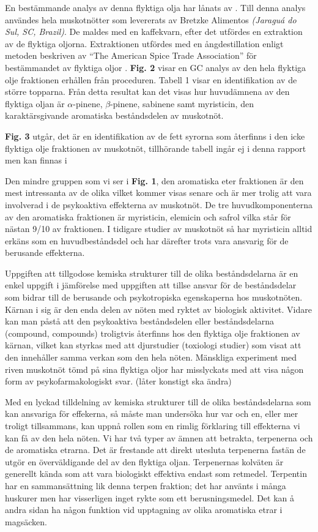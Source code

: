 \documentclass[a4paper,margin=3.25cm]{article}
\begin{document}
En bestämmande analys av denna flyktiga olja har lånats av \cite{spricigo1999extraction}.
Till denna analys användes hela muskotnötter som levererats av Bretzke Alimentos \textit{(Jaraguá do Sul, SC, Brazil)}. De maldes med en kaffekvarn, efter det utfördes
en extraktion av de flyktiga oljorna. Extraktionen utfördes med en ångdestillation enligt metoden beskriven av ``The American Spice Trade Association'' för bestämmandet av flyktiga oljor
\cite[citerad av Ferreira]{spricigo1999extraction}.
\textbf{Fig. 2} visar en GC analys av den hela flyktiga olje fraktionen erhållen
från proceduren. Tabell 1 visar en identifikation av de större topparna.
Från detta resultat kan det visas hur huvudämnena av den flyktiga oljan är $\alpha$-pinene, $\beta$-pinene, sabinene samt myristicin, den karaktärsgivande aromatiska beståndsdelen av muskotnöt.

\textbf{Fig. 3} utgår, det är en identifikation av de fett syrorna som återfinns i den icke flyktiga olje fraktionen av muskotnöt, tillhörande tabell ingår ej i denna rapport men kan finnas i \cite[s.258]{spricigo1999extraction}

Den mindre gruppen som vi ser i \textbf{Fig. 1}, den aromatiska
eter fraktionen är den mest intressanta av de olika vilket kommer visas senare
och är mer trolig att vara involverad i de psykoaktiva effekterna av
muskotnöt.
De tre huvudkomponenterna av den aromatiska fraktionen är myristicin, elemicin
och safrol vilka står för nästan 9/10 av fraktionen.
I tidigare studier av muskotnöt så har myristicin alltid erkäns som en
huvudbeståndsdel och har därefter trots vara ansvarig för de berusande effekterna.

Uppgiften att tillgodose kemiska strukturer till de olika beståndsdelarna är
en enkel uppgift i jämförelse med uppgiften att tillse ansvar för de
beståndsdelar som bidrar till de berusande och psykotropiska egenskaperna hos muskotnöten.
Kärnan i sig är den enda delen av nöten med ryktet av biologisk aktivitet.
Vidare kan man påstå att den psykoaktiva beståndsdelen eller beståndsdelarna (compound, compounds)
troligtvis återfinns hos den flyktiga olje fraktionen av kärnan, vilket kan styrkas
med att djurstudier (toxiologi studier) som visat att den innehåller samma
verkan som den hela nöten.
Mänskliga experiment med riven muskotnöt tömd på sina flyktiga oljor har
misslyckats med att visa någon form av psykofarmakologiskt svar. (låter konstigt ska ändra) \cite{truitt}


Med en lyckad tilldelning av kemiska strukturer till de olika beståndsdelarna
som kan ansvariga för effekerna, så måste man undersöka hur var och en, eller
mer troligt tillsammans, kan uppnå rollen som en rimlig förklaring till
effekterna vi kan få av den hela nöten.
Vi har två typer av ämnen att betrakta, terpenerna och de aromatiska etrarna.
Det är frestande att direkt utesluta terpenerna fastän de utgör en överväldigande
del av den flyktiga oljan. Terpenernas kolväten är generellt kända som att vara
biologiskt effektiva endast som retmedel.
Terpentin har en sammansättning lik denna terpen fraktion; det har använts
i många huskurer men har visserligen inget rykte som ett berusningsmedel.
Det kan å andra sidan ha någon funktion vid upptagning av olika aromatiska etrar i
magsäcken.
\end{document}
